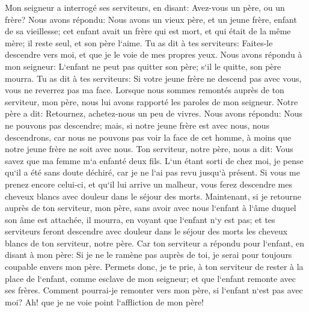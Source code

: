 \verse Mon seigneur a interrogé ses serviteurs, en disant: Avez-vous un père, ou un frère? 
\verse Nous avons répondu: Nous avons un vieux père, et un jeune frère, enfant de sa vieillesse; cet enfant avait un frère qui est mort, et qui était de la même mère; il reste seul, et son père l`aime. 
\verse Tu as dit à tes serviteurs: Faites-le descendre vers moi, et que je le voie de mes propres yeux. 
\verse Nous avons répondu à mon seigneur: L`enfant ne peut pas quitter son père; s`il le quitte, son père mourra. 
\verse Tu as dit à tes serviteurs: Si votre jeune frère ne descend pas avec vous, vous ne reverrez pas ma face. 
\verse Lorsque nous sommes remontés auprès de ton serviteur, mon père, nous lui avons rapporté les paroles de mon seigneur. 
\verse Notre père a dit: Retournez, achetez-nous un peu de vivres. 
\verse Nous avons répondu: Nous ne pouvons pas descendre; mais, si notre jeune frère est avec nous, nous descendrons, car nous ne pouvons pas voir la face de cet homme, à moins que notre jeune frère ne soit avec nous. 
\verse Ton serviteur, notre père, nous a dit: Vous savez que ma femme m`a enfanté deux fils. 
\verse L`un étant sorti de chez moi, je pense qu`il a été sans doute déchiré, car je ne l`ai pas revu jusqu`à présent. 
\verse Si vous me prenez encore celui-ci, et qu`il lui arrive un malheur, vous ferez descendre mes cheveux blancs avec douleur dans le séjour des morts. 
\verse Maintenant, si je retourne auprès de ton serviteur, mon père, sans avoir avec nous l`enfant à l`âme duquel son âme est attachée, 
\verse il mourra, en voyant que l`enfant n`y est pas; et tes serviteurs feront descendre avec douleur dans le séjour des morts les cheveux blancs de ton serviteur, notre père. 
\verse Car ton serviteur a répondu pour l`enfant, en disant à mon père: Si je ne le ramène pas auprès de toi, je serai pour toujours coupable envers mon père. 
\verse Permets donc, je te prie, à ton serviteur de rester à la place de l`enfant, comme esclave de mon seigneur; et que l`enfant remonte avec ses frères. 
\verse Comment pourrai-je remonter vers mon père, si l`enfant n`est pas avec moi? Ah! que je ne voie point l`affliction de mon père! 

